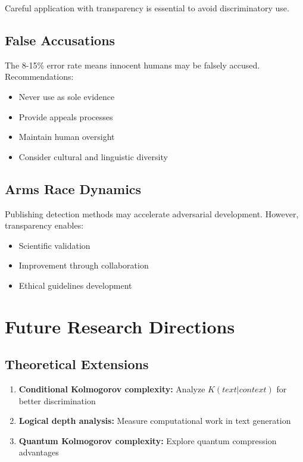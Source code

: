 \documentclass[12pt,a4paper]{report}
\begin{document}
Careful application with transparency is essential to avoid discriminatory use.

\subsection{False Accusations}

The 8-15\% error rate means innocent humans may be falsely accused. Recommendations:
\begin{itemize}
    \item Never use as sole evidence
    \item Provide appeals processes
    \item Maintain human oversight
    \item Consider cultural and linguistic diversity
\end{itemize}

\subsection{Arms Race Dynamics}

Publishing detection methods may accelerate adversarial development. However, transparency enables:
\begin{itemize}
    \item Scientific validation
    \item Improvement through collaboration
    \item Ethical guidelines development
\end{itemize}

\section{Future Research Directions}

\subsection{Theoretical Extensions}

\begin{enumerate}
    \item \textbf{Conditional Kolmogorov complexity:} Analyze $K(text|context)$ for better discrimination
    \item \textbf{Logical depth analysis:} Measure computational work in text generation
    \item \textbf{Quantum Kolmogorov complexity:} Explore quantum compression advantages
\end{enumerate}
\end{document}
